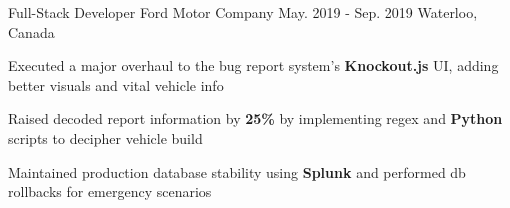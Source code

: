 \begin{cventries}
  \cventry
    {Full-Stack Developer} %
    {Ford Motor Company} %
    {May. 2019 - Sep. 2019} %
    {Waterloo, Canada} %
    {
      \begin{cvitems} %
        \item Executed a major overhaul to the bug report system's \textbf{Knockout.js} UI, adding better visuals and vital vehicle info
        \item Raised decoded report information by \textbf{25\%} by implementing regex and \textbf{Python} scripts to decipher vehicle build
        \item Maintained production database stability using \textbf{Splunk} and performed db rollbacks for emergency scenarios
      \end{cvitems}
    }

\end{cventries}
